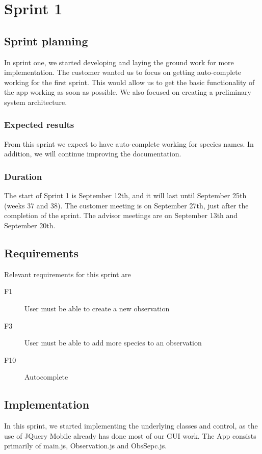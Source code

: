 \section{Sprint 1}

\subsection{Sprint planning}

	In sprint one, we started developing and laying the ground work for more implementation. The customer wanted us to focus on getting auto-complete working for the first sprint. This would allow us to get the basic functionality of the app working as soon as possible. We also focused on creating a preliminary system architecture.

\subsubsection{Expected results}
 From this sprint we expect to have auto-complete working for species names. In addition, we will continue improving the documentation.
	
\subsubsection{Duration}
The start of Sprint 1 is September 12th, and it will last until September 25th (weeks 37 and 38). The customer meeting is on September 27th, just after the completion of the sprint. The advisor meetings are on September 13th and September 20th.
	
\subsection{Requirements}

Relevant requirements for this sprint are
\begin{description}
	\item[F1] User must be able to create a new observation
	\item[F3] User must be able to add more species to an observation
	\item[F10] Autocomplete
\end{description}

\subsection{Implementation}
In this sprint, we started implementing the underlying classes and control, as the use of JQuery Mobile already has done most of our GUI work. The App consists primarily of main.js, Observation.js and ObsSepc.js.


